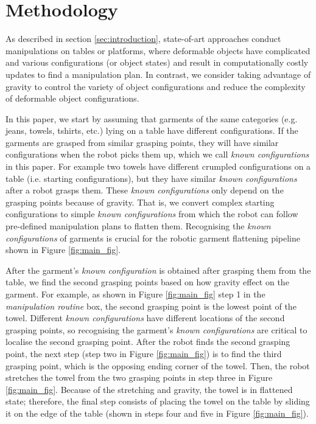 \documentclass[conference]{IEEEtran}
\begin{document}
\section{Methodology \label{sec:methodology}}
As described in section \ref{sec:introduction}, state-of-art approaches conduct manipulations on tables or platforms, where deformable objects have complicated and various configurations (or object states) and result in computationally costly updates to find a manipulation plan. In contrast, we consider taking advantage of gravity to control the variety of object configurations and reduce the complexity of deformable object configurations.

In this paper, we start by assuming that garments of the same categories (e.g. jeans, towels, tshirts, etc.) lying on a table have different configurations. If the garments are grasped from similar grasping points, they will have similar configurations when the robot picks them up, which we call \textit{known configurations} in this paper. For example two towels have different crumpled configurations on a table (i.e. starting configurations), but they have similar \textit{known configurations} after a robot grasps them. These \textit{known configurations} only depend on the grasping points because of gravity. That is, we convert complex starting configurations to simple \textit{known configurations} from which the robot can follow pre-defined manipulation plans to flatten them. Recognising the \textit{known configurations} of garments is crucial for the robotic garment flattening pipeline shown in Figure \ref{fig:main_fig}.

After the garment's \textit{known configuration} is obtained after grasping them from the table, we find the second grasping points based on how gravity effect on the garment. For example, as shown in Figure \ref{fig:main_fig} step 1 in the \textit{manipulation routine} box, the second grasping point is the lowest point of the towel. Different \textit{known configurations}  have different locations of the second grasping points, so recognising the garment's \textit{known configurations} are critical to localise the second grasping point. After the robot finds the second grasping point, the next step (step two in Figure \ref{fig:main_fig}) is to find the third grasping point, which is the opposing ending corner of the towel. Then, the robot stretches the towel from the two grasping points in step three in Figure \ref{fig:main_fig}. Because of the stretching and gravity, the towel is in flattened state; therefore, the final step consists of placing the towel on the table by sliding it on the edge of the table (shown in steps four and five in Figure \ref{fig:main_fig}).
\end{document}
